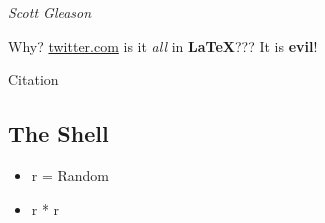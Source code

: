 \textit{Scott Gleason} 

Why? \href{Why}{twitter.com} is it \textit{all} in \textbf{LaTeX}??? It is \textbf{evil}!

Citation\cite{Ferry_2006}


\subsection{The Shell}
\begin{itemize}
\item r = Random
\item r * r
\end{itemize}